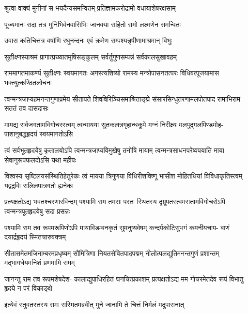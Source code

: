 \twolineshloka
{श्रुत्वा वाक्यं मुनीनां स भयदैन्यसमन्वितम्}
{प्रतिज्ञामकरोद्रामो वधायाशेषरक्षसाम्} %

\twolineshloka
{पूज्यमानः सदा तत्र मुनिभिर्वनवासिभिः}
{जानक्या सहितो रामो लक्ष्मणेन समन्वितः} %

\twolineshloka
{उवास कतिचित्तत्र वर्षाणि रघुनन्दनः}
{एवं क्रमेण सम्पश्यन्नृषीणामाश्रमान् विभुः} %

\twolineshloka
{सुतीक्ष्णस्याश्रमं प्रागात्प्रख्यातमृषिसङ्कुलम्}
{सर्वर्तुगुणसम्पन्नं सर्वकालसुखावहम्} %

\threelineshloka
{राममागतमाकर्ण्य सुतीक्ष्णः स्वयमागतः}
{अगस्त्यशिष्यो रामस्य मन्त्रोपासनतत्परः}
{विधिवत्पूजयामास भक्त्युत्कण्ठितलोचनः} %


\fourlineindentedshloka
{त्वन्मन्त्रजाप्यहमनन्तगुणाप्रमेय}
{सीतापते शिवविरिञ्चिसमाश्रिताङ्घ्रे}
{संसारसिन्धुतरणामलपोतपाद}
{रामाभिराम सततं तव दासदासः} %

\fourlineindentedshloka
{मामद्य सर्वजगतामविगोचरस्त्वम्}
{त्वन्मायया सुतकलत्रगृहान्धकूपे}
{मग्नं निरीक्ष्य मलपुद्गलपिण्डमोह-}
{पाशानुबद्धहृदयं स्वयमागतोऽसि} %

\fourlineindentedshloka
{त्वं सर्वभूतहृदयेषु कृतालयोऽपि}
{त्वन्मन्त्रजाप्यविमुखेषु तनोषि मायाम्}
{त्वन्मन्त्रसाधनपरेष्वपयाति माया}
{सेवानुरूपफलदोऽसि यथा महीपः} %

\fourlineindentedshloka
{विश्वस्य सृष्टिलयसंस्थितिहेतुरेकः}
{त्वं मायया त्रिगुणया विधिरीशविष्णू}
{भासीश मोहितधियां विविधाकृतिस्त्वम्}
{यद्वद्रविः सलिलपात्रगतो ह्यनेकः} %

\fourlineindentedshloka
{प्रत्यक्षतोऽद्य भवतश्चरणारविन्दम्}
{पश्यामि राम तमसः परतः स्थितस्य}
{दृग्रूपतस्त्वमसतामविगोचरोऽपि}
{त्वन्मन्त्रपूतहृदयेषु सदा प्रसन्नः} %

\fourlineindentedshloka
{पश्यामि राम तव रूपमरूपिणोऽपि}
{मायाविडम्बनकृतं सुमनुष्यवेषम्}
{कन्दर्पकोटिसुभगं कमनीयचाप-}
{बाणं दयार्द्रहृदयं स्मितचारुवक्त्रम्} %

\fourlineindentedshloka
{सीतासमेतमजिनाम्बरमप्रधृष्यम्}
{सौमित्रिणा नियतसेवितपादपद्मम्}
{नीलोत्पलद्युतिमनन्तगुणं प्रशान्तम्}
{मद्भागधेयमनिशं प्रणमामि रामम्} %

\fourlineindentedshloka
{जानन्तु राम तव रूपमशेषदेश-}
{कालाद्युपाधिरहितं घनचित्प्रकाशम्}
{प्रत्यक्षतोऽद्य मम गोचरमेतदेव}
{रूपं विभातु हृदये न परं विकाङ्क्षे} %

\twolineshloka
{इत्येवं स्तुवतस्तस्य रामः सस्मितमब्रवीत्}
{मुने जानामि ते चित्तं निर्मलं मदुपासनात्} %

